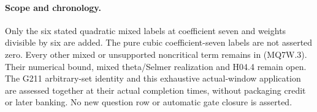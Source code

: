 \paragraph{Scope and chronology.}
Only the six stated quadratic mixed labels at coefficient seven
and weights divisible by six are added. The pure cubic
coefficient-seven labels are not asserted zero. Every other
mixed or unsupported noncritical term remains in (MQ7W.3).
Their numerical bound, mixed theta/Selmer realization and H04.4
remain open. The G211 arbitrary-set identity and this exhaustive
actual-window application are assessed together at their actual
completion times, without packaging credit or later banking.
No new question row or automatic gate closure is asserted.
